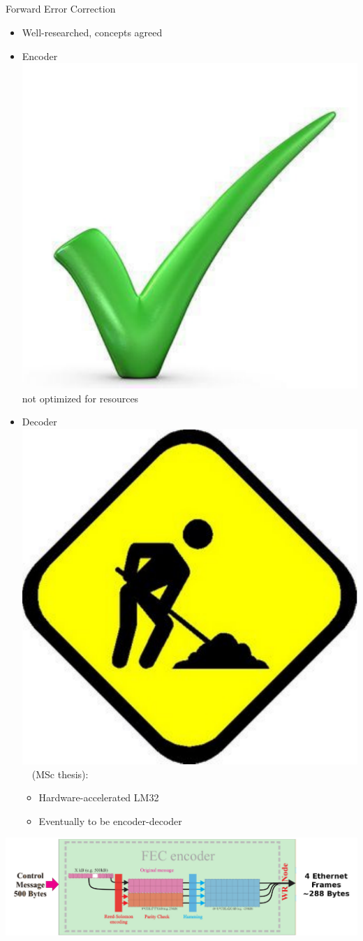 \documentclass[compress,red]{beamer}
\begin{document}
\subsection{}
\begin{frame}{Forward Error Correction}

  \begin{itemize}
    \item Well-researched, concepts agreed
    \item Encoder \includegraphics[width=.5cm]{misc/big-tick.pdf}  not optimized for resources
    \item Decoder \includegraphics[width=.5cm]{misc/underconstruction.pdf}~~(MSc thesis):
    \begin{itemize}
      \item Hardware-accelerated LM32
      \item Eventually to be encoder-decoder
    \end{itemize}

  \end{itemize}

      \begin{center}
	\includegraphics[width=.9\textwidth]{robustness/FEC_v2.pdf}
      \end{center}  

\end{frame}
\end{document}
